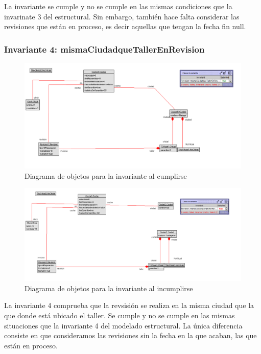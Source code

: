 \documentclass[12pt.a4paper]{article}
\begin{document}
La invariante se cumple y no se cumple en las mismas condiciones que la invarinate 3 del estructural. Sin embargo, también hace falta considerar las revisiones que están en proceso, es decir aquellas que tengan la fecha fin null.

\subsubsection{Invariante 4: mismaCiudadqueTallerEnRevision}
\vspace{1.0 cm}
\begin{figure}[H]
     \includegraphics[width=1\linewidth]{Soils/dinamico_inv4_bien.png}
     \caption{Diagrama de objetos para la invariante al cumplirse}
\end{figure}
\begin{figure}[H]
     \includegraphics[width=1\linewidth]{Soils/dinamico_inv4_false.png}
     \caption{Diagrama de objetos para la invariante al incumplirse}
\end{figure}

La invariante 4 comprueba que la revsisión se realiza en la misma ciudad que la que donde está ubicado el taller. Se cumple y no se cumple en las mismas situaciones que la invariante 4 del modelado estructural. La única diferencia consiste en que consideramos las revisiones sin la fecha en la que acaban, las que están en proceso.
\end{document}
